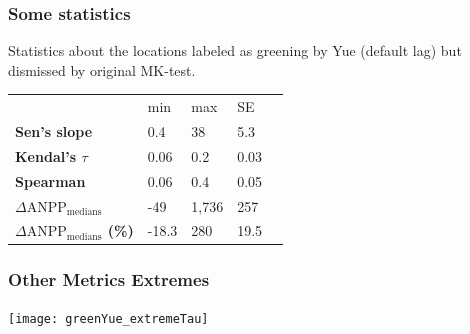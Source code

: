 \documentclass[serif, xcolor={dvipsnames}]{beamer} %
\begin{document}
\begin{frame}
\frametitle{Some statistics}
Statistics about the locations labeled as greening by Yue (default lag) but dismissed by original MK-test.
\begin{table}[!ht]
\centering
\captionsetup{singlelinecheck=false, format=hang}
\label{tab:Trendcounts}
\begin{tabular}{lllll}
\bottomrule
\rowcolor{shadecolor} 
&  min & max & SE \\ 
\rowcolor{aliceblue} 
\textbf{Sen's slope} & 0.4 & 38 & 5.3 \\
\textbf{Kendal's $\tau$}  & 0.06 & 0.2 &  0.03 \\
\rowcolor{aliceblue} 
\textbf{Spearman}  & 0.06  & 0.4 & 0.05  \\
\textbf{\scriptsize $\Delta \text{ANPP}_{\text{medians}}$} & -49 & 1,736 & 257 \\
\rowcolor{aliceblue}\textbf{\scriptsize $\Delta \text{ANPP}_{\text{medians}}$ (\%)}  & -18.3 & 280 & 19.5 \\
\toprule
\end{tabular}
\end{table}
\end{frame}


\begin{frame}
\frametitle{Other Metrics Extremes}
\begin{center}
\texttt{[image: greenYue\_extremeTau]}
\end{center}
\end{frame}
\end{document}
